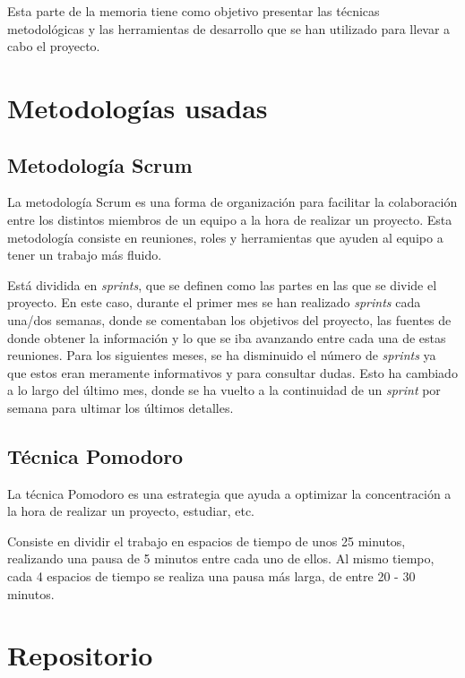 
Esta parte de la memoria tiene como objetivo presentar las técnicas metodológicas y las herramientas de desarrollo que se han utilizado para llevar a cabo el proyecto.


\section{Metodologías usadas}

\subsection{Metodología Scrum}

La metodología Scrum\cite{MetScrum} es una forma de organización para facilitar la colaboración entre los distintos miembros de un equipo a la hora de realizar un proyecto. Esta metodología consiste en reuniones, roles y herramientas que ayuden al equipo a tener un trabajo más fluido. 

Está dividida en \textit{sprints}, que se definen como las partes en las que se divide el proyecto. En este caso, durante el primer mes se han realizado \textit{sprints} cada una/dos semanas, donde se comentaban los objetivos del proyecto, las fuentes de donde obtener la información y lo que se iba avanzando entre cada una de estas reuniones. Para los siguientes meses, se ha disminuido el número de \textit{sprints} ya que estos eran meramente informativos y para consultar dudas. Esto ha cambiado a lo largo del último mes, donde se ha vuelto a la continuidad de un \textit{sprint} por semana para ultimar los últimos detalles.

\subsection{Técnica Pomodoro}

La técnica Pomodoro\cite{TecPomodoro} es una estrategia que ayuda a optimizar la concentración a la hora de realizar un proyecto, estudiar, etc.

Consiste en dividir el trabajo en espacios de tiempo de unos 25 minutos, realizando una pausa de 5 minutos entre cada uno de ellos. Al mismo tiempo, cada 4 espacios de tiempo se realiza una pausa más larga, de entre 20 - 30 minutos.


\section{Repositorio}

